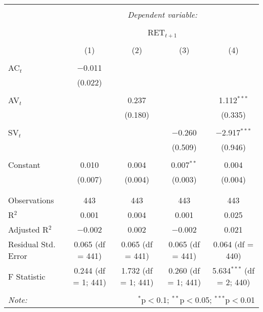 
\begin{table}[!htbp] \centering 
  \caption{} 
  \label{} 
\begin{tabular}{@{\extracolsep{5pt}}lcccc} 
\\[-1.8ex]\hline 
\hline \\[-1.8ex] 
 & \multicolumn{4}{c}{\textit{Dependent variable:}} \\ 
\cline{2-5} 
\\[-1.8ex] & \multicolumn{4}{c}{RET$_{t+1}$} \\ 
\\[-1.8ex] & (1) & (2) & (3) & (4)\\ 
\hline \\[-1.8ex] 
 AC$_{t}$ & $-$0.011 &  &  &  \\ 
  & (0.022) &  &  &  \\ 
  & & & & \\ 
 AV$_{t}$ &  & 0.237 &  & 1.112$^{***}$ \\ 
  &  & (0.180) &  & (0.335) \\ 
  & & & & \\ 
 SV$_{t}$ &  &  & $-$0.260 & $-$2.917$^{***}$ \\ 
  &  &  & (0.509) & (0.946) \\ 
  & & & & \\ 
 Constant & 0.010 & 0.004 & 0.007$^{**}$ & 0.004 \\ 
  & (0.007) & (0.004) & (0.003) & (0.004) \\ 
  & & & & \\ 
\hline \\[-1.8ex] 
Observations & 443 & 443 & 443 & 443 \\ 
R$^{2}$ & 0.001 & 0.004 & 0.001 & 0.025 \\ 
Adjusted R$^{2}$ & $-$0.002 & 0.002 & $-$0.002 & 0.021 \\ 
Residual Std. Error & 0.065 (df = 441) & 0.065 (df = 441) & 0.065 (df = 441) & 0.064 (df = 440) \\ 
F Statistic & 0.244 (df = 1; 441) & 1.732 (df = 1; 441) & 0.260 (df = 1; 441) & 5.634$^{***}$ (df = 2; 440) \\ 
\hline 
\hline \\[-1.8ex] 
\textit{Note:}  & \multicolumn{4}{r}{$^{*}$p$<$0.1; $^{**}$p$<$0.05; $^{***}$p$<$0.01} \\ 
\end{tabular} 
\end{table} 
